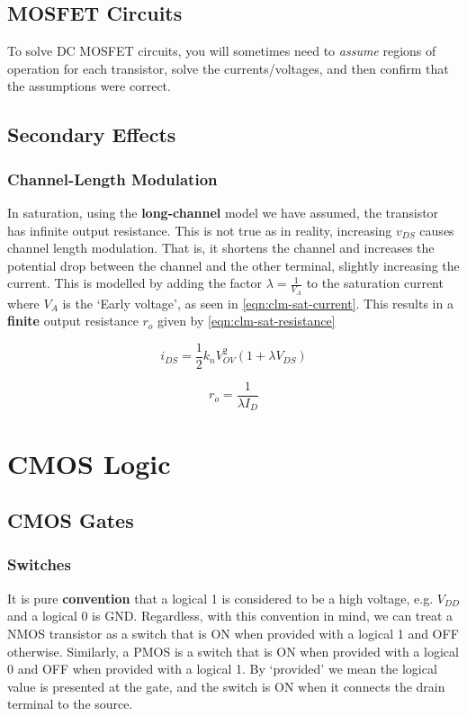 \documentclass[11pt]{report}
\begin{document}
\section{MOSFET Circuits}
To solve DC MOSFET circuits, you will sometimes need to \textit{assume} regions of operation for each transistor, solve the currents/voltages, and then confirm that the assumptions were correct.

\section{Secondary Effects}

\subsection{Channel-Length Modulation}
In saturation, using the \textbf{long-channel} model we have assumed, the transistor has infinite output resistance. This is not true as in reality, increasing $v_{DS}$ causes channel length modulation. That is, it shortens the channel and increases the potential drop between the channel and the other terminal, slightly increasing the current. This is modelled by adding the factor $\lambda = \frac{1}{V_A}$ to the saturation current where $V_A$ is the `Early voltage', as seen in \ref{eqn:clm-sat-current}. This results in a \textbf{finite} output resistance $r_o$ given by \ref{eqn:clm-sat-resistance}

\begin{equation}
	\label{eqn:clm-sat-current}
	i_{DS} = \frac{1}{2}k_nV_{OV}^2 (1 + \lambda V_{DS})
\end{equation}

\begin{equation}
	\label{eqn:clm-sat-resistance}
	r_o = \frac{1}{\lambda I_{D}}
\end{equation}


\chapter{CMOS Logic}

\section{CMOS Gates}

\subsection{Switches}
It is pure \textbf{convention} that a logical 1 is considered to be a high voltage, e.g. $V_{DD}$ and a logical 0 is GND. Regardless, with this convention in mind, we can treat a NMOS transistor as a switch that is ON when provided with a logical 1 and OFF otherwise. Similarly, a PMOS is a switch that is ON when provided with a logical 0 and OFF when provided with a logical 1. By `provided' we mean the logical value is presented at the gate, and the switch is ON when it connects the drain terminal to the source.
\end{document}
